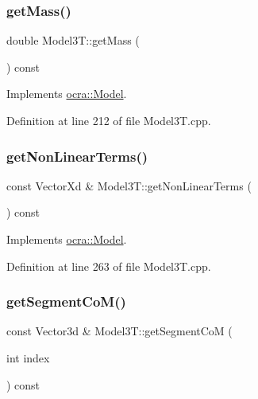 \subsubsection{\texorpdfstring{get\+Mass()}{getMass()}}
{\footnotesize\ttfamily double Model3\+T\+::get\+Mass (\begin{DoxyParamCaption}{ }\end{DoxyParamCaption}) const\hspace{0.3cm}{\ttfamily [virtual]}}



Implements \hyperlink{classocra_1_1Model_a6237f96c89946f6c09be38761f128f28}{ocra\+::\+Model}.



Definition at line 212 of file Model3\+T.\+cpp.

\hypertarget{classModel3T_af41d3f87cb77877320f4c589d9cf7ffe}{}\label{classModel3T_af41d3f87cb77877320f4c589d9cf7ffe} 
\subsubsection{\texorpdfstring{get\+Non\+Linear\+Terms()}{getNonLinearTerms()}}
{\footnotesize\ttfamily const Vector\+Xd \& Model3\+T\+::get\+Non\+Linear\+Terms (\begin{DoxyParamCaption}{ }\end{DoxyParamCaption}) const\hspace{0.3cm}{\ttfamily [virtual]}}



Implements \hyperlink{classocra_1_1Model_ac494939416d3ddcb6e5cf0ece43f3098}{ocra\+::\+Model}.



Definition at line 263 of file Model3\+T.\+cpp.

\hypertarget{classModel3T_a7e3f88de763eb1faf3ba60dc032a99fb}{}\label{classModel3T_a7e3f88de763eb1faf3ba60dc032a99fb} 
\subsubsection{\texorpdfstring{get\+Segment\+Co\+M()}{getSegmentCoM()}}
{\footnotesize\ttfamily const Vector3d \& Model3\+T\+::get\+Segment\+CoM (\begin{DoxyParamCaption}\item[{int}]{index }\end{DoxyParamCaption}) const\hspace{0.3cm}{\ttfamily [virtual]}}



